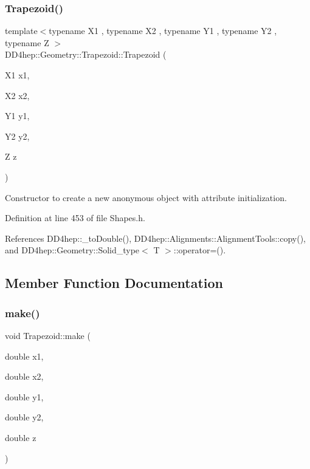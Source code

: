 \subsubsection{\texorpdfstring{Trapezoid()}{Trapezoid()}\hspace{0.1cm}{\footnotesize\ttfamily [6/6]}}
{\footnotesize\ttfamily template$<$typename X1 , typename X2 , typename Y1 , typename Y2 , typename Z $>$ \\
D\+D4hep\+::\+Geometry\+::\+Trapezoid\+::\+Trapezoid (\begin{DoxyParamCaption}\item[{X1}]{x1,  }\item[{X2}]{x2,  }\item[{Y1}]{y1,  }\item[{Y2}]{y2,  }\item[{Z}]{z }\end{DoxyParamCaption})\hspace{0.3cm}{\ttfamily [inline]}}



Constructor to create a new anonymous object with attribute initialization. 



Definition at line 453 of file Shapes.\+h.



References D\+D4hep\+::\+\_\+to\+Double(), D\+D4hep\+::\+Alignments\+::\+Alignment\+Tools\+::copy(), and D\+D4hep\+::\+Geometry\+::\+Solid\+\_\+type$<$ T $>$\+::operator=().



\subsection{Member Function Documentation}
\hypertarget{class_d_d4hep_1_1_geometry_1_1_trapezoid_ae6901e6e8639b330b5ecacff7c91792c}{}\label{class_d_d4hep_1_1_geometry_1_1_trapezoid_ae6901e6e8639b330b5ecacff7c91792c} 
\subsubsection{\texorpdfstring{make()}{make()}}
{\footnotesize\ttfamily void Trapezoid\+::make (\begin{DoxyParamCaption}\item[{double}]{x1,  }\item[{double}]{x2,  }\item[{double}]{y1,  }\item[{double}]{y2,  }\item[{double}]{z }\end{DoxyParamCaption})\hspace{0.3cm}{\ttfamily [private]}}



